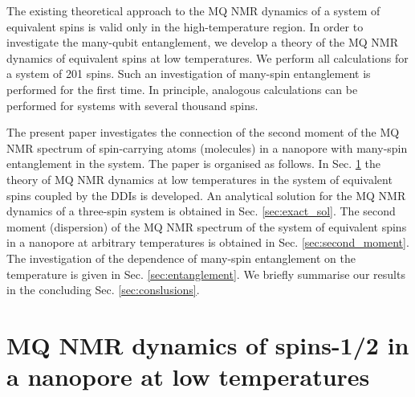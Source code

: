 \documentclass[
    pra,  
    twocolumn, 
    floatfix, 
    amsmath, 
    amssymb, 
    superscriptaddress
]{revtex4-1}
\begin{document}
\par
The existing theoretical approach \cite{lab:mq_nmr_dyn_in_nanopores_2009} to the MQ NMR dynamics of a system of equivalent spins is valid only in the high-temperature region. In order to investigate the many-qubit entanglement, we develop a theory of the MQ NMR dynamics of equivalent spins at low temperatures. 
We perform all calculations for a system of 201 spins. 
Such an investigation of many-spin entanglement is performed for the first time.
In principle, analogous calculations can be performed for  systems with several thousand  spins. 
\par
The present paper investigates the connection of the second moment of the MQ NMR spectrum of spin-carrying atoms (molecules) in a nanopore with many-spin entanglement in the system. The paper is organised as follows. In Sec. \ref{sec:mq_dyn} the theory of MQ NMR dynamics at low temperatures in the system of equivalent spins coupled by the DDIs is developed. An analytical solution for the MQ NMR dynamics of a three-spin system is obtained in Sec. \ref{sec:exact_sol}. The second moment (dispersion) of the MQ NMR spectrum of the system of equivalent spins in a nanopore at arbitrary temperatures is obtained in Sec. \ref{sec:second_moment}. The investigation of the dependence of  many-spin entanglement on the temperature is given in Sec. \ref{sec:entanglement}. We briefly summarise our results in the concluding Sec. \ref{sec:conslusions}.


\section{MQ NMR dynamics of spins-1/2 in a nanopore at low temperatures}
\label{sec:mq_dyn}
\end{document}
